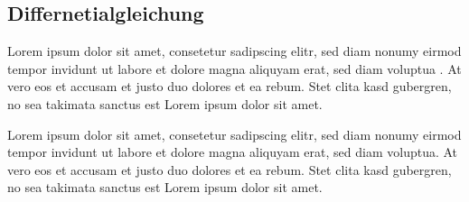 \subsection{Differnetialgleichung}
Lorem ipsum dolor sit amet, consetetur sadipscing elitr, sed diam
nonumy eirmod tempor invidunt ut labore et dolore magna aliquyam
erat, sed diam voluptua \cite{parzyl:bibtex}.
At vero eos et accusam et justo duo dolores et ea rebum.
Stet clita kasd gubergren, no sea takimata sanctus est Lorem ipsum
dolor sit amet.

Lorem ipsum dolor sit amet, consetetur sadipscing elitr, sed diam
nonumy eirmod tempor invidunt ut labore et dolore magna aliquyam
erat, sed diam voluptua.
At vero eos et accusam et justo duo dolores et ea rebum.  Stet clita
kasd gubergren, no sea takimata sanctus est Lorem ipsum dolor sit
amet.



